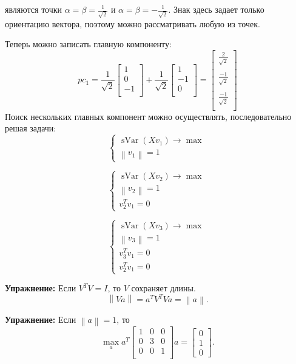 \documentclass[12pt]{article} %
\theoremstyle{definition} %
\DeclareMathOperator{\sVar}{sVar}
\begin{document}
являются точки \(\alpha=\beta=\frac{1}{\sqrt{2}}\) и \(\alpha=\beta=-\frac{1}{\sqrt{2}}\). Знак здесь задает только ориентацию вектора, поэтому можно рассматривать любую из точек.

Теперь можно записать главную компоненту:
\[pc_1 =
\frac{1}{\sqrt{2}} \begin{bmatrix}
1\\
0\\
-1\\
\end{bmatrix}
+
\frac{1}{\sqrt{2}} \begin{bmatrix}
1\\
-1\\
0\\
\end{bmatrix}
=
\begin{bmatrix}
\frac{2}{\sqrt{2}}\\~\\
\frac{-1}{\sqrt{2}}\\~\\
\frac{-1}{\sqrt{2}}\\
\end{bmatrix}
\]
Поиск нескольких главных компонент можно осуществлять, последовательно решая задачи:
\[
\begin{cases}
\sVar(Xv_1) \to \max \\
\left\| v_1 \right\| = 1
\end{cases}
\]

\[
\begin{cases}
\sVar(Xv_2) \to \max \\
\left\| v_2 \right\| = 1 \\
v_2^Tv_1 = 0
\end{cases}
\]

\[
\begin{cases}
\sVar(Xv_3) \to \max \\
\left\| v_3 \right\| = 1 \\
v_3^Tv_1 = 0\\
v_2^Tv_1 = 0
\end{cases}
\]

\textbf{Упражнение:} Если \(V^TV=I\), то \(V\) сохраняет длины.
\[ \left\| Va \right\| = a^TV^TVa = \left\| a \right\|. \]

\textbf{Упражнение:} Если \( \left\| a \right\| = 1 \),
то
\[ \max_a a^T
\begin{bmatrix}
1 & 0 & 0 \\
0 & 3 & 0 \\
0 & 0 & 1 \\
\end{bmatrix}
a =
\begin{bmatrix}
0\\
1\\
0
\end{bmatrix}.
\]
\end{document}

